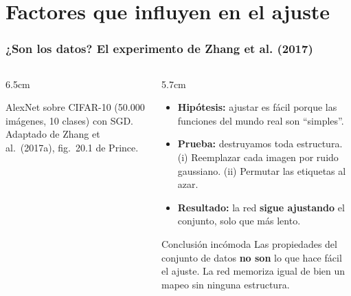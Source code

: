 \documentclass[aspectratio=169, 10pt]{beamer}
\newcommand{\fuente}[1]{{\scriptsize\color{StanfordGray}#1}}
\begin{document}
\section{Factores que influyen en el ajuste}

\begin{frame}
\frametitle{¿Son los datos? El experimento de Zhang et al. (2017)}
\begin{columns}[c]
\begin{column}{6.5cm}
\begin{center}
\end{center}
\vspace{-0.4em}
\fuente{AlexNet sobre CIFAR-10 (50.000 im\'agenes, 10 clases) con SGD. Adaptado de Zhang et al.\ (2017a), fig.~20.1 de Prince.}
\end{column}
\begin{column}{5.7cm}
\begin{itemize}
	\item \textbf{Hip\'otesis:} ajustar es f\'acil porque las funciones del mundo real son ``simples''.
	\item \textbf{Prueba:} destruyamos toda estructura. (i) Reemplazar cada imagen por ruido gaussiano. (ii) Permutar las etiquetas al azar.
	\item \textbf{Resultado:} la red \textbf{sigue ajustando} el conjunto, solo que m\'as lento.
\end{itemize}
\vspace{0.4em}
\begin{exampleblock}{Conclusión incómoda}
\footnotesize
Las propiedades del conjunto de datos \textbf{no son} lo que hace f\'acil el ajuste. La red memoriza igual de bien un mapeo sin ninguna estructura.
\end{exampleblock}
\end{column}
\end{columns}
\end{frame}
\end{document}
